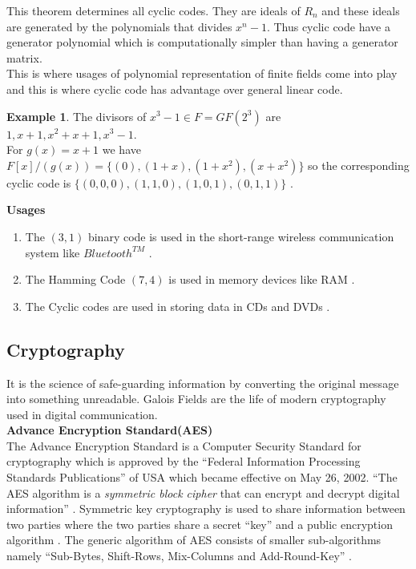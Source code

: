 \documentclass[11pt]{amsart}
\theoremstyle{plain}
\theoremstyle{definition}
\newtheorem{example}[theorem]{Example}
\numberwithin{equation}{section}
\begin{document}
 This theorem determines all cyclic codes. They are ideals of \(R_n\) and these ideals are generated by the polynomials that divides \(x^n-1\). Thus cyclic code have a generator polynomial which is computationally simpler than having a generator matrix. \\[2mm]
  This is where usages of polynomial representation of finite fields come into play and this is where cyclic code has advantage over general linear code.

\begin{example}
  The divisors of \(x^3-1 \in F=GF(2^{3})\) are \(1, x+1, x^2+x+1, x^3-1\).\\
  For \(g(x)=x+1\) we have \(F[x]/(g(x))=\{(0),(1+x),(1+x^2),(x+x^2)\}\) so the corresponding cyclic code is \(\{(0,0,0),(1,1,0),(1,0,1),(0,1,1)\}\) \cite{error_correct}.
\end{example}

\textbf{Usages}\\
\begin{enumerate}
\item The \((3,1)\) binary code is used in the short-range wireless communication system like \(Bluetooth^{TM}\) \cite{wireless}.
\item The Hamming Code \((7,4)\) is used in memory devices like RAM \cite{coding}.

\item The Cyclic codes are used in storing data in CDs and DVDs \cite{coding}.
\end{enumerate}


\subsection{Cryptography}
\noindent It is the science of safe-guarding information by converting the original message into something unreadable. Galois Fields are the life of modern cryptography used in digital communication.\\

\textbf{Advance Encryption Standard(AES)}\\
The Advance Encryption Standard is a Computer Security Standard for cryptography which is approved by the ``Federal Information Processing Standards Publications'' of USA which became effective on May 26, 2002. ``The AES algorithm is a \textit{symmetric block cipher} that can encrypt and decrypt digital information'' \cite{aes}. Symmetric key cryptography is used to share information between two parties where the two parties share a secret ``key'' and a public encryption algorithm \cite{wireless}. The generic algorithm of AES consists of smaller sub-algorithms namely ``Sub-Bytes, Shift-Rows, Mix-Columns and Add-Round-Key'' \cite{aes}.
\end{document}
